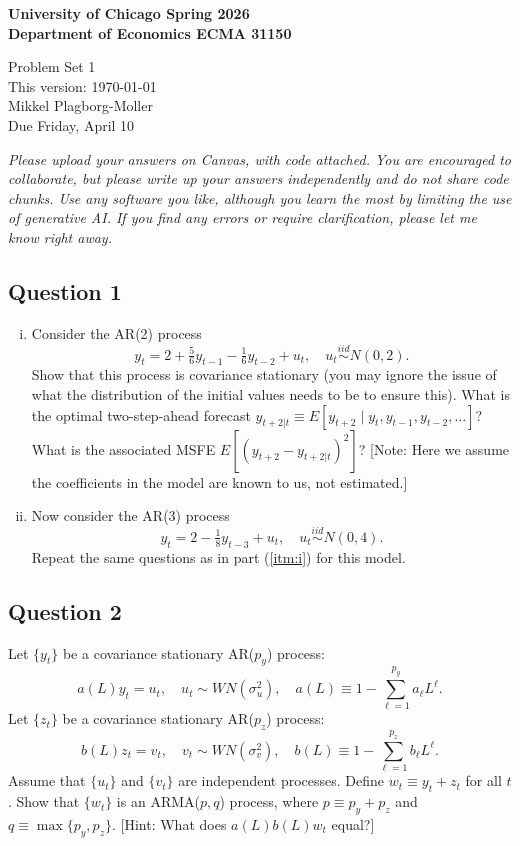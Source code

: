 \documentclass[12pt]{article}
\theoremstyle{plain}
\begin{document}
{\noindent \bf University of Chicago \hfill
Spring 2026 \\
Department of Economics \hfill ECMA 31150}

\begin{center}
{\Large Problem Set 1} \\
This version: \today \\[1ex]
Mikkel Plagborg-Moller \\
\vspace{0.5\baselineskip}
Due Friday, April 10
\end{center}
\vspace{0.2\baselineskip}

\noindent \emph{Please upload your answers on Canvas, with code attached. You are encouraged to collaborate, but please write up your answers independently and do not share code chunks. Use any software you like, although you learn the most by limiting the use of generative AI. If you find any errors or require clarification, please let me know right away.}

\subsection*{Question 1}
\begin{enumerate}[i)]
\item \label{itm:i} Consider the AR(2) process
\[y_t = 2 + \tfrac{5}{6}y_{t-1} - \tfrac{1}{6}y_{t-2} + u_t,\quad u_t \overset{iid}{\sim} N(0,2).\]
Show that this process is covariance stationary (you may ignore the issue of what the distribution of the initial values needs to be to ensure this). What is the optimal two-step-ahead forecast $y_{t+2|t} \equiv E[y_{t+2} \mid y_t,y_{t-1},y_{t-2},\dots]$? What is the associated MSFE $E[(y_{t+2}-y_{t+2|t})^2]$? [Note: Here we assume the coefficients in the model are known to us, not estimated.]
\item Now consider the AR(3) process
\[y_t = 2 - \tfrac{1}{8}y_{t-3} + u_t,\quad u_t \overset{iid}{\sim} N(0,4).\]
Repeat the same questions as in part (\ref{itm:i}) for this model.
\end{enumerate}

\subsection*{Question 2}
Let $\lbrace y_t \rbrace$ be a covariance stationary AR($p_y$) process:
\[a(L)y_t=u_t, \quad u_t \sim \mathit{WN}(\sigma_u^2),\quad a(L) \equiv 1-\sum_{\ell=1}^{p_y} a_\ell L^\ell.\]
Let $\lbrace z_t \rbrace$ be a covariance stationary AR($p_z$) process:
\[b(L)z_t=v_t, \quad v_t \sim \mathit{WN}(\sigma_v^2),\quad b(L) \equiv 1-\sum_{\ell=1}^{p_z} b_\ell L^\ell.\]
Assume that $\lbrace u_t \rbrace$ and $\lbrace v_t \rbrace$ are independent processes. Define $w_t \equiv y_t+z_t$ for all $t$. Show that $\lbrace w_t \rbrace$ is an ARMA($p,q$) process, where $p \equiv p_y+p_z$ and $q \equiv \max\lbrace p_y,p_z \rbrace$. [Hint: What does $a(L)b(L)w_t$ equal?]
\end{document}
